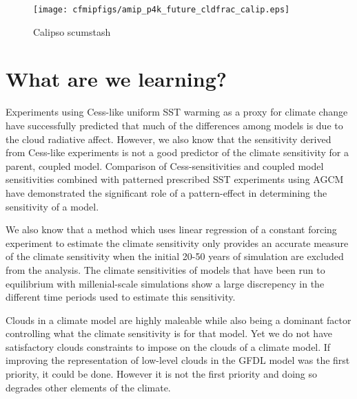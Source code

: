 \documentclass[11pt]{article}   	%
\begin{document}
\begin{figure}
  \texttt{[image: cfmipfigs/amip\_p4k\_future\_cldfrac\_calip.eps]}
  \caption{Calipso scumstash}
  \label{fig:calipso_amip_comparison}
\end{figure}

\section{What are we learning?}

Experiments using Cess-like uniform SST warming as a proxy for climate change have successfully predicted that much of the differences 
among models is due to the cloud radiative affect.  However, we also know that the sensitivity derived from Cess-like experiments is not
a good predictor of the climate sensitivity for a parent, coupled model.  Comparison of Cess-sensitivities and coupled model sensitivities 
combined with patterned prescribed SST experiments using AGCM have demonstrated the significant role of a pattern-effect in determining 
the sensitivity of a model.  

We also know that a method which uses linear regression of a constant forcing experiment to estimate the climate sensitivity only 
provides an accurate measure of the climate sensitivity when the initial 20-50 years of simulation are excluded from the analysis.  
The climate sensitivities of models that have been run to equilibrium with millenial-scale simulations show a large discrepency in the
different time periods used to estimate this sensitivity.  

Clouds in a climate model are highly maleable while also being a dominant factor controlling what the climate sensitivity is for that model.  
Yet we do not have satisfactory clouds constraints to impose on the clouds of a climate model.  If improving the representation of low-level
clouds in the GFDL model was the first priority, it could be done.  However it is not the first priority and doing so degrades other elements of 
the climate.  
\end{document}
